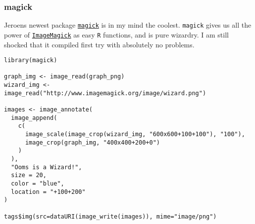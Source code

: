 \subsubsection{magick}

Jeroen\textquotesingle{}s newest package \href{https://github.com/jeroenooms/magick}{\texttt{magick}}
is in my mind the coolest. \texttt{magick} gives us all the power of
\href{http://www.imagemagick.org/script/index.php}{\texttt{ImageMagick}} as easy \texttt{R}
functions, and is pure wizardry. I am still shocked that it compiled
first try with absolutely no problems.

\begin{verbatim}
library(magick)

graph_img <- image_read(graph_png)
wizard_img <- image_read("http://www.imagemagick.org/image/wizard.png")

images <- image_annotate(
  image_append(
    c(
      image_scale(image_crop(wizard_img, "600x600+100+100"), "100"),
      image_crop(graph_img, "400x400+200+0")
    )
  ),
  "Ooms is a Wizard!",
  size = 20,
  color = "blue",
  location = "+100+200"
)

tags$img(src=dataURI(image_write(images)), mime="image/png")
\end{verbatim}
